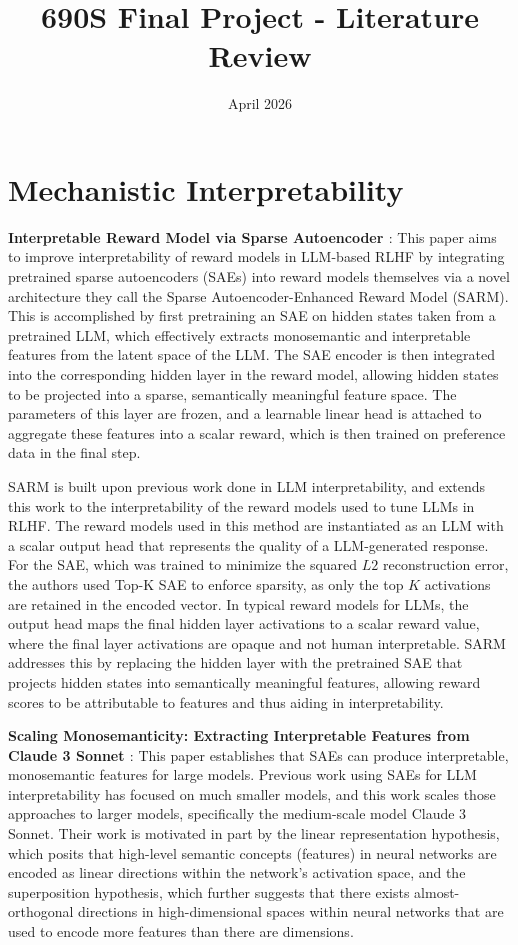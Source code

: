 \documentclass[11pt]{article}
\title{690S Final Project - Literature Review}
\author{}
\date{April 2026}
\begin{document}
\maketitle

\section{Mechanistic Interpretability}
\textbf{Interpretable Reward Model via Sparse Autoencoder \citep{Zhang2026Interpretable}}: 
This paper aims to improve interpretability of reward models in LLM-based RLHF by integrating pretrained sparse autoencoders (SAEs) into reward models themselves via a novel architecture they call the Sparse Autoencoder-Enhanced Reward Model (SARM). This is accomplished by first pretraining an SAE on hidden states taken from a pretrained LLM, which effectively extracts monosemantic and interpretable features from the latent space of the LLM.  The SAE encoder is then integrated into the corresponding hidden layer in the reward model, allowing hidden states to be projected into a sparse, semantically meaningful feature space. The parameters of this layer are frozen, and a learnable linear head is attached to aggregate these features into a scalar reward, which is then trained on preference data in the final step.  

\vspace{2mm}
SARM is built upon previous work done in LLM interpretability, and extends this work to the interpretability of the reward models used to tune LLMs in RLHF.  The reward models used in this method are instantiated as an LLM with a scalar output head that represents the quality of a LLM-generated response. For the SAE, which was trained to minimize the squared $L2$ reconstruction error, the authors used Top-K SAE to enforce sparsity, as only the top $K$ activations are retained in the encoded vector.  In typical reward models for LLMs, the output head maps the final hidden layer activations to a scalar reward value, where the final layer activations are opaque and not human interpretable.  SARM addresses this by replacing the hidden layer with the pretrained SAE that projects hidden states into semantically meaningful features, allowing reward scores to be attributable to features and thus aiding in interpretability. 

\bigskip

\textbf{Scaling Monosemanticity: Extracting Interpretable Features from Claude 3 Sonnet \citep{templeton2024scaling}}: This paper establishes that SAEs can produce interpretable, monosemantic features for large models.  Previous work using SAEs for LLM interpretability has focused on much smaller models, and this work scales those approaches to larger models, specifically the medium-scale model Claude 3 Sonnet.  Their work is motivated in part by the linear representation hypothesis, which posits that high-level semantic concepts (features) in neural networks are encoded as linear directions within the network's activation space, and the superposition hypothesis, which further suggests that there exists almost-orthogonal directions in high-dimensional spaces within neural networks that are used to encode more features than there are dimensions.   
\end{document}
